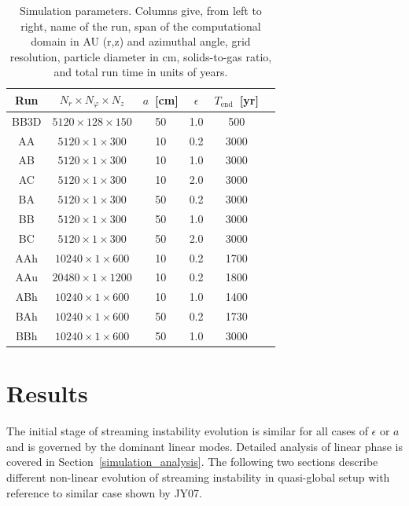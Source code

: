 \begin{table}
   \centering
   \begin{tabular}{cccccc}
      \hline
      Run & $N_r \times N_\varphi \times N_z$ &
      $a$~[cm] & $\epsilon$ & $T_\textrm{end}$~[yr] \\
      \hline
      BB3D &  $5120  \times 128 \times 150$  & 50  & 1.0 & 500  \\
      AA   &  $5120  \times 1   \times 300$  & 10  & 0.2 & 3000 \\
      AB   &  $5120  \times 1   \times 300$  & 10  & 1.0 & 3000 \\
      AC   &  $5120  \times 1   \times 300$  & 10  & 2.0 & 3000 \\
      BA   &  $5120  \times 1   \times 300$  & 50  & 0.2 & 3000 \\
      BB   &  $5120  \times 1   \times 300$  & 50  & 1.0 & 3000 \\
      BC   &  $5120  \times 1   \times 300$  & 50  & 2.0 & 3000 \\
      AAh  &  $10240 \times 1   \times 600$  & 10  & 0.2 & 1700 \\
      AAu  &  $20480 \times 1   \times 1200$ & 10  & 0.2 & 1800 \\
      ABh  &  $10240 \times 1   \times 600$  & 10  & 1.0 & 1400 \\
      BAh  &  $10240 \times 1   \times 600$  & 50  & 0.2 & 1730 \\
      BBh  &  $10240 \times 1   \times 600$  & 50  & 1.0 & 3000 \\
      \hline
   \end{tabular}
\caption{Simulation parameters. Columns give, from left to right, name of the
   run, span of the computational domain in AU (r,z) and azimuthal angle, grid
   resolution, particle diameter in cm, solids-to-gas ratio, and total run time
   in units of years.} 
\label{tab1} 
\end{table}

\section{Results}
\label{sec:results}
The initial stage of streaming instability evolution is similar for all cases of
$\epsilon$ or $a$ and is governed by the dominant linear modes. Detailed
analysis of linear phase is covered in Section~\ref{simulation_analysis}. The
following two sections describe different non-linear evolution of streaming
instability in quasi-global setup with reference to similar case shown by JY07.
%
